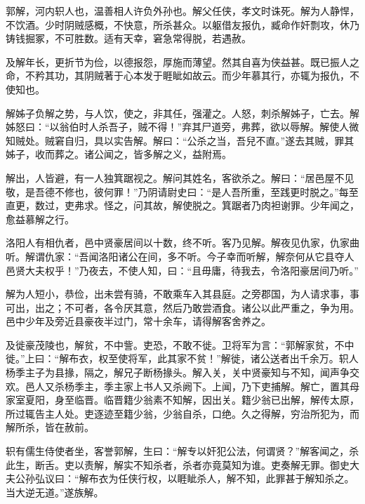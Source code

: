 \documentclass[12pt,UTF8]{ctexbook}
\begin{document}
郭解，河内轵人也，温善相人许负外孙也。解父任侠，孝文时诛死。解为人静悍，不饮酒。少时阴贼感概，不快意，所杀甚众。以躯借友报仇，臧命作奸剽攻，休乃铸钱掘冢，不可胜数。适有天幸，窘急常得脱，若遇赦。



及解年长，更折节为俭，以德报怨，厚施而薄望。然其自喜为侠益甚。既已振人之命，不矜其功，其阴贼著于心本发于睚眦如故云。而少年慕其行，亦辄为报仇，不使知也。



解姊子负解之势，与人饮，使之，非其任，强灌之。人怒，刺杀解姊子，亡去。解姊怒曰：“以翁伯时人杀吾子，贼不得！”弃其尸道旁，弗葬，欲以辱解。解使人微知贼处。贼窘自归，具以实告解。解曰：“公杀之当，吾兒不直。”遂去其贼，罪其姊子，收而葬之。诸公闻之，皆多解之义，益附焉。



解出，人皆避，有一人独箕踞视之。解问其姓名，客欲杀之。解曰：“居邑屋不见敬，是吾德不修也，彼何罪！”乃阴请尉史曰：“是人吾所重，至践更时脱之。”每至直更，数过，吏弗求。怪之，问其故，解使脱之。箕踞者乃肉袒谢罪。少年闻之，愈益慕解之行。



洛阳人有相仇者，邑中贤豪居间以十数，终不听。客乃见解。解夜见仇家，仇家曲听。解谓仇家：“吾闻洛阳诸公在间，多不听。今子幸而听解，解奈何从它县夺人邑贤大夫权乎！”乃夜去，不使人知，曰：“且毋庸，待我去，令洛阳豪居间乃听。”



解为人短小，恭俭，出未尝有骑，不敢乘车入其县庭。之旁郡国，为人请求事，事可出，出之；不可者，各令厌其意，然后乃敢尝酒食。诸公以此严重之，争为用。邑中少年及旁近县豪夜半过门，常十余车，请得解客舍养之。



及徙豪茂陵也，解贫，不中訾。吏恐，不敢不徙。卫将军为言：“郭解家贫，不中徙。”上曰：“解布衣，权至使将军，此其家不贫！”解徙，诸公送者出千余万。轵人杨季主子为县掾，隔之，解兄子断杨掾头。解入关，关中贤豪知与不知，闻声争交欢。邑人又杀杨季主，季主家上书人又杀阙下。上闻，乃下吏捕解。解亡，置其母家室夏阳，身至临晋。临晋籍少翁素不知解，因出关。籍少翁已出解，解传太原，所过辄告主人处。吏逐迹至籍少翁，少翁自杀，口绝。久之得解，穷治所犯为，而解所杀，皆在赦前。



轵有儒生侍使者坐，客誉郭解，生曰：“解专以奸犯公法，何谓贤？”解客闻之，杀此生，断舌。吏以责解，解实不知杀者，杀者亦竟莫知为谁。吏奏解无罪。御史大夫公孙弘议曰：“解布衣为任侠行权，以睚眦杀人，解不知，此罪甚于解知杀之。当大逆无道。”遂族解。
\end{document}
